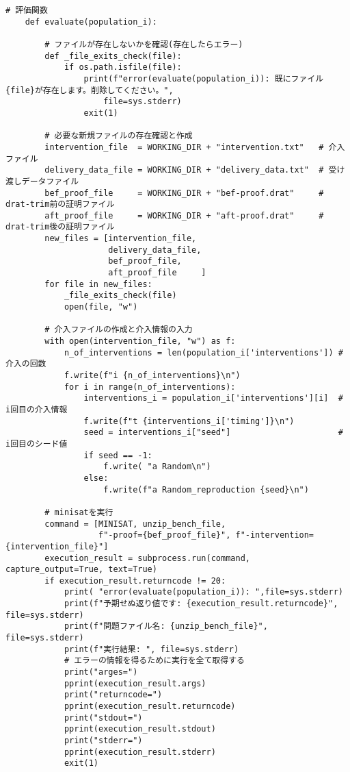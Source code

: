\begin{lstlisting}[caption=評価関数evaluate]
    # 評価関数
    def evaluate(population_i):

        # ファイルが存在しないかを確認(存在したらエラー)
        def _file_exits_check(file):
            if os.path.isfile(file):
                print(f"error(evaluate(population_i)): 既にファイル{file}が存在します。削除してください。",
                    file=sys.stderr)
                exit(1)

        # 必要な新規ファイルの存在確認と作成
        intervention_file  = WORKING_DIR + "intervention.txt"   # 介入ファイル
        delivery_data_file = WORKING_DIR + "delivery_data.txt"  # 受け渡しデータファイル
        bef_proof_file     = WORKING_DIR + "bef-proof.drat"     # drat-trim前の証明ファイル
        aft_proof_file     = WORKING_DIR + "aft-proof.drat"     # drat-trim後の証明ファイル
        new_files = [intervention_file,
                     delivery_data_file,
                     bef_proof_file,
                     aft_proof_file     ]
        for file in new_files:
            _file_exits_check(file)
            open(file, "w")
    
        # 介入ファイルの作成と介入情報の入力
        with open(intervention_file, "w") as f:
            n_of_interventions = len(population_i['interventions']) # 介入の回数
            f.write(f"i {n_of_interventions}\n")
            for i in range(n_of_interventions):
                interventions_i = population_i['interventions'][i]  # i回目の介入情報
                f.write(f"t {interventions_i['timing']}\n")
                seed = interventions_i["seed"]                      # i回目のシード値
                if seed == -1:
                    f.write( "a Random\n")
                else:
                    f.write(f"a Random_reproduction {seed}\n")
    
        # minisatを実行
        command = [MINISAT, unzip_bench_file,
                   f"-proof={bef_proof_file}", f"-intervention={intervention_file}"]
        execution_result = subprocess.run(command, capture_output=True, text=True)
        if execution_result.returncode != 20:
            print( "error(evaluate(population_i)): ",file=sys.stderr)
            print(f"予期せぬ返り値です: {execution_result.returncode}", file=sys.stderr)
            print(f"問題ファイル名: {unzip_bench_file}", file=sys.stderr)
            print(f"実行結果: ", file=sys.stderr)
            # エラーの情報を得るために実行を全て取得する
            print("arges=")
            pprint(execution_result.args)
            print("returncode=")
            pprint(execution_result.returncode)
            print("stdout=")
            pprint(execution_result.stdout)
            print("stderr=")
            pprint(execution_result.stderr)
            exit(1)
       

\end{lstlisting}
